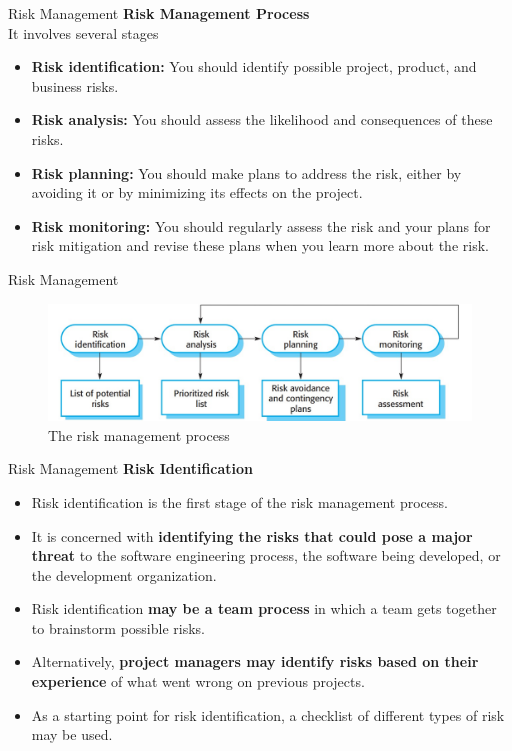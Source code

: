 \documentclass{beamer}
\begin{document}
\begin{frame}{Risk Management}
\textbf{Risk Management Process}\\
It involves several stages
\begin{itemize}
	\item \textbf{Risk identification:} You should identify possible project, product, and business risks.
	\item \textbf{Risk analysis:} You should assess the likelihood and consequences of these risks.
	\item \textbf{Risk planning:} You should make plans to address the risk, either by avoiding it or by minimizing its 
	effects on the project.
	\item \textbf{Risk monitoring:} You should regularly assess the risk and your plans for risk mitigation and revise these 
	plans when you learn more about the risk.
\end{itemize}
\end{frame}
\begin{frame}{Risk Management}
	\begin{figure}
	\includegraphics[scale=.45]{img/m4_1}
	\caption{The risk 
		management process
	}
\end{figure}
\end{frame}
\begin{frame}{Risk Management}
\textbf{Risk Identification}
\begin{itemize}
	\item Risk identification is the first stage of the risk management process.
	\item It is concerned with \textbf{identifying the 
		risks that could pose a major threat }to the software engineering process, the software being 
	developed, or the development organization. 
	\item Risk identification \textbf{may be a team process} in which a team gets together to brainstorm possible risks. 
	\item Alternatively, \textbf{project managers may identify risks based on their experience }of what went wrong on 
	previous projects.

	\item  As a starting point for risk identification, a checklist of different types 
	of risk may be used.
\end{itemize}
\end{frame}
\end{document}
